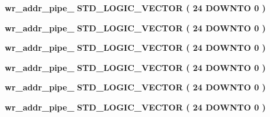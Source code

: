 \begin{DoxyCompactItemize}
{\bf wr\+\_\+addr\+\_\+pipe\+\_} {\bfseries \textcolor{comment}{S\+T\+D\+\_\+\+L\+O\+G\+I\+C\+\_\+\+V\+E\+C\+T\+OR}\textcolor{vhdlchar}{ }\textcolor{vhdlchar}{(}\textcolor{vhdlchar}{ }\textcolor{vhdlchar}{ } \textcolor{vhdldigit}{24} \textcolor{vhdlchar}{ }\textcolor{keywordflow}{D\+O\+W\+N\+TO}\textcolor{vhdlchar}{ }\textcolor{vhdlchar}{ } \textcolor{vhdldigit}{0} \textcolor{vhdlchar}{ }\textcolor{vhdlchar}{)}\textcolor{vhdlchar}{ }} 
\item 
{\bf wr\+\_\+addr\+\_\+pipe\+\_} {\bfseries \textcolor{comment}{S\+T\+D\+\_\+\+L\+O\+G\+I\+C\+\_\+\+V\+E\+C\+T\+OR}\textcolor{vhdlchar}{ }\textcolor{vhdlchar}{(}\textcolor{vhdlchar}{ }\textcolor{vhdlchar}{ } \textcolor{vhdldigit}{24} \textcolor{vhdlchar}{ }\textcolor{keywordflow}{D\+O\+W\+N\+TO}\textcolor{vhdlchar}{ }\textcolor{vhdlchar}{ } \textcolor{vhdldigit}{0} \textcolor{vhdlchar}{ }\textcolor{vhdlchar}{)}\textcolor{vhdlchar}{ }} 
\item 
{\bf wr\+\_\+addr\+\_\+pipe\+\_} {\bfseries \textcolor{comment}{S\+T\+D\+\_\+\+L\+O\+G\+I\+C\+\_\+\+V\+E\+C\+T\+OR}\textcolor{vhdlchar}{ }\textcolor{vhdlchar}{(}\textcolor{vhdlchar}{ }\textcolor{vhdlchar}{ } \textcolor{vhdldigit}{24} \textcolor{vhdlchar}{ }\textcolor{keywordflow}{D\+O\+W\+N\+TO}\textcolor{vhdlchar}{ }\textcolor{vhdlchar}{ } \textcolor{vhdldigit}{0} \textcolor{vhdlchar}{ }\textcolor{vhdlchar}{)}\textcolor{vhdlchar}{ }} 
\item 
{\bf wr\+\_\+addr\+\_\+pipe\+\_} {\bfseries \textcolor{comment}{S\+T\+D\+\_\+\+L\+O\+G\+I\+C\+\_\+\+V\+E\+C\+T\+OR}\textcolor{vhdlchar}{ }\textcolor{vhdlchar}{(}\textcolor{vhdlchar}{ }\textcolor{vhdlchar}{ } \textcolor{vhdldigit}{24} \textcolor{vhdlchar}{ }\textcolor{keywordflow}{D\+O\+W\+N\+TO}\textcolor{vhdlchar}{ }\textcolor{vhdlchar}{ } \textcolor{vhdldigit}{0} \textcolor{vhdlchar}{ }\textcolor{vhdlchar}{)}\textcolor{vhdlchar}{ }} 
\item 
{\bf wr\+\_\+addr\+\_\+pipe\+\_} {\bfseries \textcolor{comment}{S\+T\+D\+\_\+\+L\+O\+G\+I\+C\+\_\+\+V\+E\+C\+T\+OR}\textcolor{vhdlchar}{ }\textcolor{vhdlchar}{(}\textcolor{vhdlchar}{ }\textcolor{vhdlchar}{ } \textcolor{vhdldigit}{24} \textcolor{vhdlchar}{ }\textcolor{keywordflow}{D\+O\+W\+N\+TO}\textcolor{vhdlchar}{ }\textcolor{vhdlchar}{ } \textcolor{vhdldigit}{0} \textcolor{vhdlchar}{ }\textcolor{vhdlchar}{)}\textcolor{vhdlchar}{ }} 
\item 
{\bf wr\+\_\+addr\+\_\+pipe\+\_} {\bfseries \textcolor{comment}{S\+T\+D\+\_\+\+L\+O\+G\+I\+C\+\_\+\+V\+E\+C\+T\+OR}\textcolor{vhdlchar}{ }\textcolor{vhdlchar}{(}\textcolor{vhdlchar}{ }\textcolor{vhdlchar}{ } \textcolor{vhdldigit}{24} \textcolor{vhdlchar}{ }\textcolor{keywordflow}{D\+O\+W\+N\+TO}\textcolor{vhdlchar}{ }\textcolor{vhdlchar}{ } \textcolor{vhdldigit}{0} \textcolor{vhdlchar}{ }\textcolor{vhdlchar}{)}\textcolor{vhdlchar}{ }} 

\end{DoxyCompactItemize}
